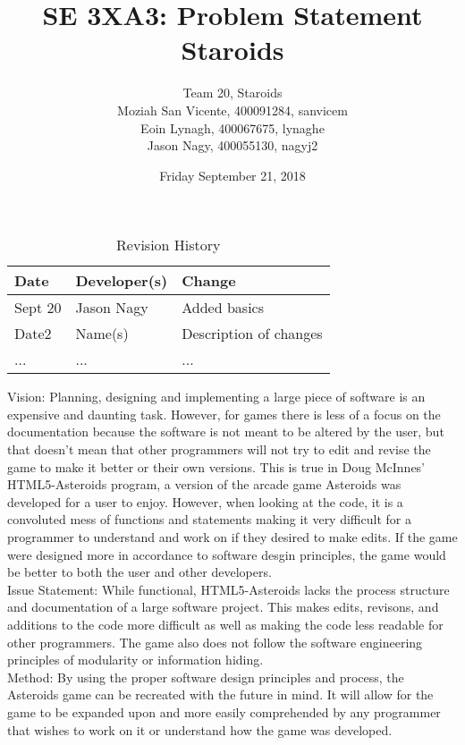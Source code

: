 \documentclass{article}
\title{SE 3XA3: Problem Statement\\Staroids}
\author{Team 20, Staroids
		\\ Moziah San Vicente, 400091284, sanvicem
		\\ Eoin Lynagh, 400067675, lynaghe
		\\ Jason Nagy, 400055130, nagyj2
}
\date{Friday September 21, 2018}
\begin{document}
\begin{table}[hp]
\caption{Revision History} \label{TblRevisionHistory}
\begin{tabularx}{\textwidth}{llX}
\toprule
\textbf{Date} & \textbf{Developer(s)} & \textbf{Change}\\
\midrule
Sept 20 & Jason Nagy & Added basics\\
Date2 & Name(s) & Description of changes\\
... & ... & ...\\
\bottomrule
\end{tabularx}
\end{table}

\newpage

\maketitle

Vision: Planning, designing and implementing a large piece of software is an expensive and
daunting task. However, for games there is less of a focus on the documentation because the
software is not meant to be altered by the user, but that doesn't mean that other programmers
will not try to edit and revise the game to make it better or their own versions.
This is true in Doug McInnes' HTML5-Asteroids program, a version of the arcade game Asteroids
was developed for a user to enjoy. However, when looking at the code, it is a convoluted mess of
functions and statements making it very difficult for a programmer to understand and work on
if they desired to make edits. If the game were designed more in accordance to software desgin
principles, the game would be better to both the user and other developers.
\\Issue Statement: While functional, HTML5-Asteroids lacks the process structure and
documentation of a large software project. This makes edits, revisons, and additions to the
code more difficult as well as making the code less readable for other programmers. The game
also does not follow the software engineering principles of modularity or information hiding.
\\Method: By using the proper software design principles and process, the Asteroids game can
be recreated with the future in mind. It will allow for the game to be expanded upon and more
easily comprehended by any programmer that wishes to work on it or understand how the game was
developed.





\end{document}
